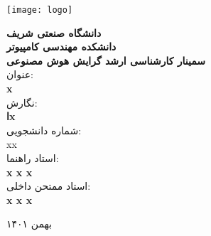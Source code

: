 \thispagestyle{empty}
\begin{center}
\texttt{[image: logo]}
\vskip 1cm

\large{
{\bf
دانشگاه صنعتی شریف\\ دانشکده مهندسی کامپیوتر\\ سمینار کارشناسی ارشد گرایش هوش مصنوعی
}
\\
\vskip 1cm
عنوان:\\
{ \bf
x 
}
\\{ \bf \large
{}}
\vskip 1cm
نگارش:\\
\textbf{اx}
\\
\vskip 0.5cm
شماره دانشجویی: \\
xx
\\
\vskip 1cm
استاد راهنما:\\
 \textbf{x x x }
 \\
\vskip 1cm
استاد ممتحن داخلی:\\
\textbf{x x x }
\\

\vskip 3.5cm

}
بهمن ۱۴۰۱
\newpage
\end{center}


